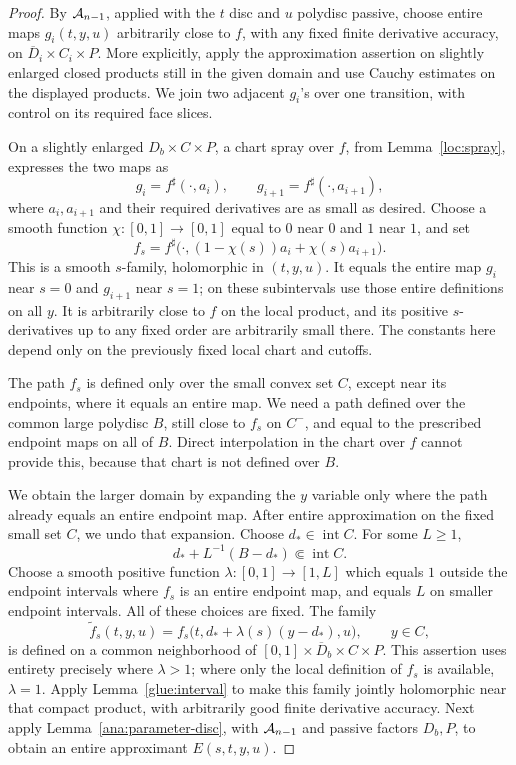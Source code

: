 \begin{proof}
By \({\cal A}_{n-1}\), applied with the \(t\) disc and \(u\)
polydisc passive, choose entire maps \(g_i(t,y,u)\) arbitrarily
close to \(f\), with any fixed finite derivative accuracy, on
\(\overline D_i\times C_i\times P\).
More explicitly, apply the approximation assertion on slightly
enlarged closed products still in the given domain and use
Cauchy estimates on the displayed products.
We join two adjacent \(g_i\)'s over
one transition, with control on its required face slices.

On a slightly enlarged \(D_b\times C\times P\), a chart spray
over \(f\), from Lemma~\ref{loc:spray}, expresses the two maps as
\[
 g_i=f^\sharp(\cdot,a_i),\qquad
 g_{i+1}=f^\sharp(\cdot,a_{i+1}),
\]
where \(a_i,a_{i+1}\) and their required derivatives are as small
as desired.  Choose a smooth function \(\chi:[0,1]\to[0,1]\)
equal to \(0\) near \(0\) and \(1\) near \(1\), and set
\[
 f_s=f^\sharp\bigl(\cdot,(1-\chi(s))a_i+\chi(s)a_{i+1}\bigr).
\]
This is a smooth \(s\)-family, holomorphic in \((t,y,u)\).
It equals the entire map \(g_i\) near \(s=0\) and \(g_{i+1}\)
near \(s=1\); on these subintervals use those entire definitions
on all \(y\).  It is arbitrarily close to \(f\) on the local
product, and its positive \(s\)-derivatives up to any fixed
order are arbitrarily small there.  The constants here depend
only on the previously fixed local chart and cutoffs.

The path $f_s$ is defined only over the small convex set $C$, except
near its endpoints, where it equals an entire map. We need a path
defined over the common large polydisc $B$, still close to $f_s$ on
$C^-$, and equal to the prescribed endpoint maps on all of $B$.
Direct interpolation in the chart over $f$ cannot provide this,
because that chart is not defined over $B$.

We obtain the larger domain by expanding the $y$ variable only
where the path already equals an entire endpoint map. After entire
approximation on the fixed small set $C$, we undo that expansion.
Choose \(d_*\in\operatorname{int}C\).  For some \(L\geq1\),
\begin{equation}\label{ana:eq:inverse-scaling}
 d_*+L^{-1}(B-d_*)\Subset\operatorname{int}C.
\end{equation}
Choose a smooth positive function \(\lambda:[0,1]\to[1,L]\)
which equals \(1\) outside the endpoint intervals where \(f_s\)
is an entire endpoint map, and equals \(L\) on smaller endpoint
intervals.  All of these choices are fixed.  The family
\[
 \widetilde f_s(t,y,u)
       =f_s\bigl(t,d_*+\lambda(s)(y-d_*),u\bigr),
 \qquad y\in C,
\]
is defined on a common neighborhood of
\([0,1]\times\overline D_b\times C\times P\).
This assertion uses entirety precisely where \(\lambda>1\);
where only the local definition of \(f_s\) is available,
\(\lambda=1\).
Apply Lemma~\ref{glue:interval} to make this family jointly
holomorphic near that compact product, with arbitrarily good
finite derivative accuracy.  Next apply
Lemma~\ref{ana:parameter-disc}, with \({\cal A}_{n-1}\) and
passive factors \(D_b,P\), to obtain an entire approximant
\(E(s,t,y,u)\).


\end{proof}
